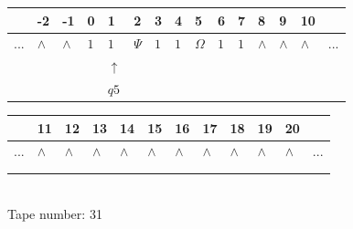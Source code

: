 \documentclass[11pt]{article}
\begin{document}
\begin{table}[H]
\centering
\begin{tabular}{lllllllllllllll}
 & -2 & -1 & 0 & 1 & 2 & 3 & 4 & 5 & 6 & 7 & 8 & 9 & 10 & \\
\hline
$...$ & \multicolumn{1}{|l|}{$\wedge$} & \multicolumn{1}{|l|}{$\wedge$} & \multicolumn{1}{|l|}{$1$} & \multicolumn{1}{|l|}{$1$} & \multicolumn{1}{|l|}{$\Psi$} & \multicolumn{1}{|l|}{$1$} & \multicolumn{1}{|l|}{$1$} & \multicolumn{1}{|l|}{$\Omega$} & \multicolumn{1}{|l|}{$1$} & \multicolumn{1}{|l|}{$1$} & \multicolumn{1}{|l|}{$\wedge$} & \multicolumn{1}{|l|}{$\wedge$} & \multicolumn{1}{|l|}{$\wedge$} & $...$\\
\hline
&  &  &  & $\uparrow$ &  &  &  &  &  &  &  &  &  &  \\
&  &  &  & $ q5 $ &  &  &  &  &  &  &  &  &  &  \\
\end{tabular}
\begin{tabular}{llllllllllll}
 & 11 & 12 & 13 & 14 & 15 & 16 & 17 & 18 & 19 & 20 & \\
\hline
$...$ & \multicolumn{1}{|l|}{$\wedge$} & \multicolumn{1}{|l|}{$\wedge$} & \multicolumn{1}{|l|}{$\wedge$} & \multicolumn{1}{|l|}{$\wedge$} & \multicolumn{1}{|l|}{$\wedge$} & \multicolumn{1}{|l|}{$\wedge$} & \multicolumn{1}{|l|}{$\wedge$} & \multicolumn{1}{|l|}{$\wedge$} & \multicolumn{1}{|l|}{$\wedge$} & \multicolumn{1}{|l|}{$\wedge$} & $...$\\
\hline
&  &  &  &  &  &  &  &  &  &  &  \\
&  &  &  &  &  &  &  &  &  &  &  \\
\end{tabular}
\\
Tape number: 31
\noindent\makebox[\linewidth]{\hdashrule{\textwidth}{1pt}{1pt}}\end{table}
\clearpage
\end{document}
